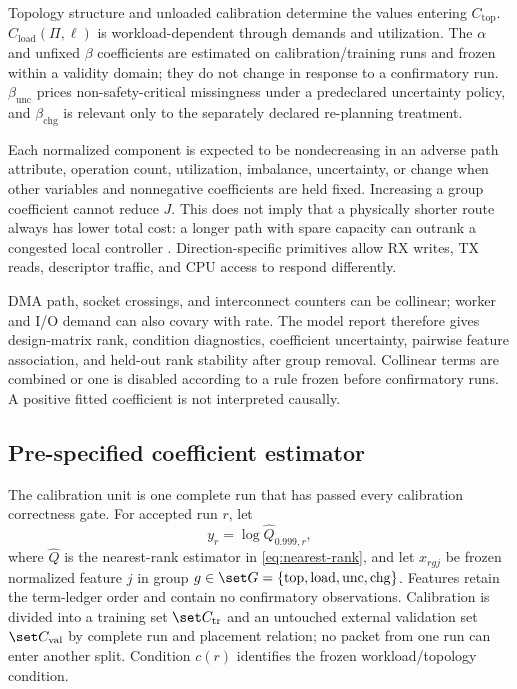 Topology structure and unloaded calibration determine the values entering $C_{\mathrm{top}}$. $C_{\mathrm{load}}(\Pi,\ell)$ is workload-dependent through demands and utilization. The $\alpha$ and unfixed $\beta$ coefficients are estimated on calibration/training runs and frozen within a validity domain; they do not change in response to a confirmatory run. $\beta_{\mathrm{unc}}$ prices non-safety-critical missingness under a predeclared uncertainty policy, and $\beta_{\mathrm{chg}}$ is relevant only to the separately declared re-planning treatment.

Each normalized component is expected to be nondecreasing in an adverse path attribute, operation count, utilization, imbalance, uncertainty, or change when other variables and nonnegative coefficients are held fixed. Increasing a group coefficient cannot reduce $J$. This does not imply that a physically shorter route always has lower total cost: a longer path with spare capacity can outrank a congested local controller \cite{lepers2015asymmetry,dashti2013carrefour,siavashi2026phoenix}. Direction-specific primitives allow RX writes, TX reads, descriptor traffic, and CPU access to respond differently.

DMA path, socket crossings, and interconnect counters can be collinear; worker and I/O demand can also covary with rate. The model report therefore gives design-matrix rank, condition diagnostics, coefficient uncertainty, pairwise feature association, and held-out rank stability after group removal. Collinear terms are combined or one is disabled according to a rule frozen before confirmatory runs. A positive fitted coefficient is not interpreted causally.

\subsection{Pre-specified coefficient estimator}

The calibration unit is one complete run that has passed every calibration correctness gate. For accepted run $r$, let
\begin{equation}
 y_r=\log \widehat Q_{0.999,r},
 \end{equation}
where $\widehat Q$ is the nearest-rank estimator in \cref{eq:nearest-rank}, and let $x_{rgj}$ be frozen normalized feature $j$ in group $g\in\set G=\{\mathrm{top},\mathrm{load},\mathrm{unc},\mathrm{chg}\}$. Features retain the term-ledger order and contain no confirmatory observations. Calibration is divided into a training set $\set C_{\mathrm{tr}}$ and an untouched external validation set $\set C_{\mathrm{val}}$ by complete run and placement relation; no packet from one run can enter another split. Condition $c(r)$ identifies the frozen workload/topology condition.

